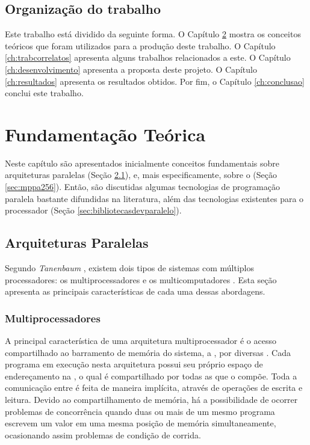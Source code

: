\section{Organização do trabalho}

Este trabalho está dividido da seguinte forma. O Capítulo \ref{ch:fundamentacaoteorica} mostra os conceitos teóricos que foram utilizados para a produção deste trabalho. O Capítulo \ref{ch:trabcorrelatos} apresenta alguns trabalhos relacionados a este. O Capítulo \ref{ch:desenvolvimento} apresenta a proposta deste projeto. O Capítulo \ref{ch:resultados} apresenta os resultados obtidos. Por fim, o Capítulo \ref{ch:conclusao} conclui este trabalho.

\chapter{Fundamentação Teórica}
\label{ch:fundamentacaoteorica}

Neste capítulo são apresentados inicialmente conceitos fundamentais sobre arquiteturas paralelas (Seção \ref{sec:arquiteturasparalelas}), e, mais especificamente, sobre o \mppa (Seção \ref{sec:mppa256}). Então, são discutidas algumas tecnologias de programação paralela bastante difundidas na literatura, além das tecnologias existentes para o processador \mppa (Seção \ref{sec:bibliotecasdevparalelo}).

\section{Arquiteturas Paralelas}
\label{sec:arquiteturasparalelas}

Segundo \textit{Tanenbaum} \etal, existem dois tipos de sistemas com múltiplos processadores: os multiprocessadores e os multicomputadores \cite{TanenbaumMordenOS}. Esta seção apresenta as principais características de cada uma dessas abordagens.

\subsection{Multiprocessadores}
\label{sec:multiprocessadores}

A principal característica de uma arquitetura multiprocessador é o acesso compartilhado ao barramento de memória do sistema, a \textit{\RAM}, por diversas \textit{\CPUs}. Cada programa em execução nesta arquitetura possui seu próprio espaço de endereçamento na \RAM, o qual é compartilhado por todas as \threads que o compõe. Toda a comunicação entre \threads é feita de maneira implícita, através de operações de escrita e leitura. Devido ao compartilhamento de memória, há a possibilidade de ocorrer problemas de concorrência quando duas ou mais \threads de um mesmo programa escrevem um valor em uma mesma posição de memória simultaneamente, ocasionando assim problemas de condição de corrida.

